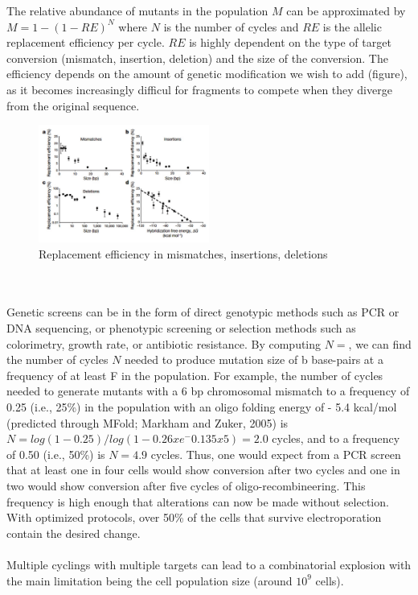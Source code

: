 \noindent
The relative abundance of mutants in the population $M$ can be approximated by $M=1-(1-RE)^N$ where $N$ is the number of cycles and $RE$ is the allelic replacement efficiency per cycle. 
$RE$ is highly dependent on the type of target conversion (mismatch, insertion, deletion) and the size of the conversion. 
The efficiency depends on the amount of genetic modification we wish to add (figure), as it becomes increasingly difficul for fragments to compete when they diverge from the original sequence.
\begin{figure}
\includegraphics[width=0.5\textwidth, center ]{rep_eff}
\caption{\label{fig:rep_eff} Replacement efficiency in mismatches, insertions, deletions}
\end{figure}
\\
\\
\noindent
Genetic screens can be in the form of direct genotypic methods such as PCR or DNA sequencing, or phenotypic screening or selection methods such as colorimetry, growth rate, or antibiotic resistance. 
By computing $N=$, we can find the number of cycles $N$ needed to produce mutation size of b base-pairs at a frequency of at least F in the population.
For example, the number of cycles needed to generate mutants with a 6 bp chromosomal mismatch to a frequency of 0.25 (i.e., 25\%) in the population with an oligo folding energy of - 5.4 kcal/mol (predicted through MFold; Markham and Zuker, 2005) is $N=log(1-0.25)/log(1-0.26x e^-0.135 x 5)=2.0$ cycles, and to a frequency of 0.50 (i.e., 50\%) is $N = 4.9$ cycles. 
Thus, one would expect from a PCR screen that at least one in four cells would show conversion after two cycles and one in two would show conversion after five cycles of oligo-recombineering. 
This frequency is high enough that alterations can now be made without selection. With optimized protocols, over 50\% of the cells that survive electroporation contain the desired change. 
\\
\\
\noindent
Multiple cyclings with multiple targets can lead to a combinatorial explosion with the main limitation being the cell population size (around $10^9$ cells). 
